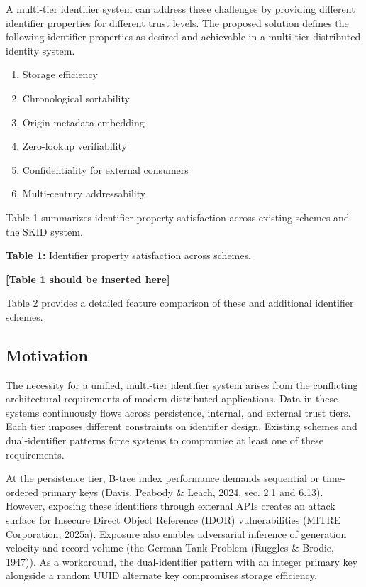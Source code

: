 \documentclass[fleqn,10pt,lineno]{wlpeerj}
\providecommand{\tightlist}{%
  \setlength{\itemsep}{0pt}\setlength{\parskip}{0pt}}
\begin{document}
A multi-tier identifier system can address these challenges by providing
different identifier properties for different trust levels. The proposed
solution defines the following identifier properties as desired and
achievable in a multi-tier distributed identity system.

\begin{enumerate}
\def\labelenumi{\arabic{enumi}.}
\tightlist
\item
  Storage efficiency
\item
  Chronological sortability
\item
  Origin metadata embedding
\item
  Zero-lookup verifiability
\item
  Confidentiality for external consumers
\item
  Multi-century addressability
\end{enumerate}

Table 1 summarizes identifier property satisfaction across existing
schemes and the SKID system.

\textbf{Table 1:} Identifier property satisfaction across schemes.

\textbf{{[}Table 1 should be inserted here{]}}

Table 2 provides a detailed feature comparison of these and additional
identifier schemes.

\newpage

\subsection{Motivation}\label{motivation}

The necessity for a unified, multi-tier identifier system arises from
the conflicting architectural requirements of modern distributed
applications. Data in these systems continuously flows across
persistence, internal, and external trust tiers. Each tier imposes
different constraints on identifier design. Existing schemes and
dual-identifier patterns force systems to compromise at least one of
these requirements.

At the persistence tier, B-tree index performance demands sequential or
time-ordered primary keys (Davis, Peabody \& Leach, 2024, sec. 2.1 and
6.13). However, exposing these identifiers through external APIs creates
an attack surface for Insecure Direct Object Reference (IDOR)
vulnerabilities (MITRE Corporation, 2025a). Exposure also enables
adversarial inference of generation velocity and record volume (the
German Tank Problem (Ruggles \& Brodie, 1947)). As a workaround, the
dual-identifier pattern with an integer primary key alongside a random
UUID alternate key compromises storage efficiency.
\end{document}
